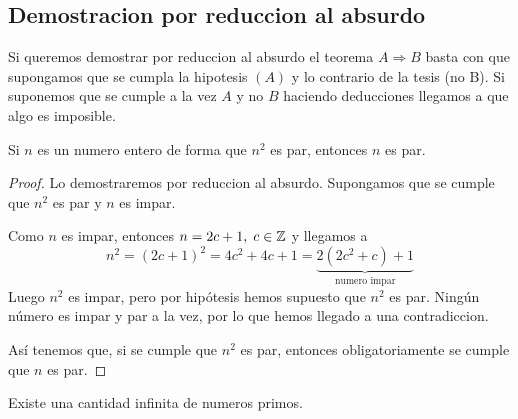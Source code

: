 \subsection{Demostracion por reduccion al absurdo}

Si queremos demostrar por reduccion al absurdo el teorema \(A \Rightarrow B \) basta con que supongamos que se cumpla la hipotesis \((A)\) y lo contrario de la tesis (no B). Si suponemos que se cumple a la vez \(A \) y no \(B\) haciendo deducciones llegamos a que algo es imposible.

\begin{theorem}
	Si \(n \) es un numero entero de forma que \(n^{2} \) es par, entonces \(n \) es par.
\end{theorem}
\begin{proof}
	Lo demostraremos por reduccion al absurdo. Supongamos que se cumple que \(n^{2} \) es par y \(n \) es impar.
	
	Como \(n \) es impar, entonces \(n = 2c + 1, \; c \in \mathbb{Z}\) y llegamos a
	\[
		n^{2} = (2c+1)^{2} = 4c^{2} + 4c + 1 = \underbrace{2(2c^{2} + c) + 1}_{\text{numero impar} }
	\]
	Luego \(n^{2} \) es impar, pero por hipótesis hemos supuesto que \(n^{2 } \) es par. Ningún número es impar y par a la vez, por lo que hemos llegado a una contradiccion.
	
	Así tenemos que, si se cumple que \(n^{2} \) es par, entonces obligatoriamente se cumple que \(n \) es par.
\end{proof}

\begin{theorem}
	\label{infinitosprimos}
	Existe una cantidad infinita de numeros primos.
\end{theorem}

